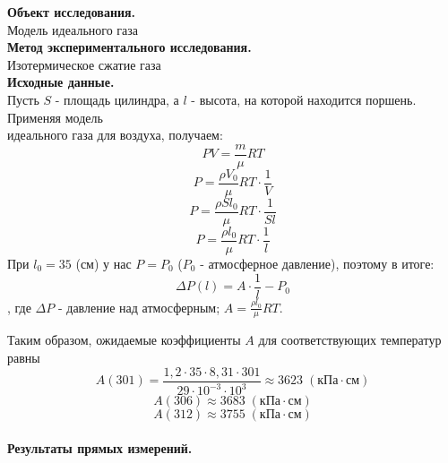 \documentclass[a4paper]{article}
\begin{document}
{\parindent=0pt\textbf{Объект исследования.}}\\
Модель идеального газа\\

{\parindent=0pt\textbf{Метод экспериментального исследования.}}\\
Изотермическое сжатие газа\\



	{\parindent=0pt\textbf{Исходные данные.}}\\
	Пусть $S$ - площадь цилиндра, а $l$ - высота, на которой находится поршень. Применяя модель\\ идеального газа для воздуха, получаем:
	$$ PV=\frac{m}{\mu} RT$$
	$$ P=\frac{\rho V_0}{\mu}RT\cdot\frac{1}{V}$$
	$$ P=\frac{\rho S l_0}{\mu}RT\cdot\frac{1}{S l}$$
	$$ P=\frac{\rho  l_0}{\mu}RT\cdot\frac{1}{ l}$$
	При $l_0=35$ (см) у нас $P=P_0$ ($P_0$ - атмосферное давление), поэтому в итоге:
	$$\Delta P(l)=A\cdot \frac{1}{l} - P_0$$
	, где $\Delta P$ - давление над атмосферным; $A = \frac{\rho  l_0}{\mu}RT$.\\
	\parindent=0pt
	
	Таким образом, ожидаемые коэффициенты $A$ для соответствующих температур  равны
	$$ A(301)=\frac{1,2\cdot35\cdot8,31\cdot301}{29\cdot10^{-3}\cdot10^3}\approx3623\;\left( \mbox{кПа}\cdot\mbox{см}\right) $$
	$$ A(306)\approx3683\;\left( \mbox{кПа}\cdot\mbox{см}\right) $$
	$$ A(312)\approx3755\;\left( \mbox{кПа}\cdot\mbox{см}\right) $$\\
	
		\newpage
	{\parindent=0pt\textbf{Результаты прямых измерений.}}\\
	
\end{document}

